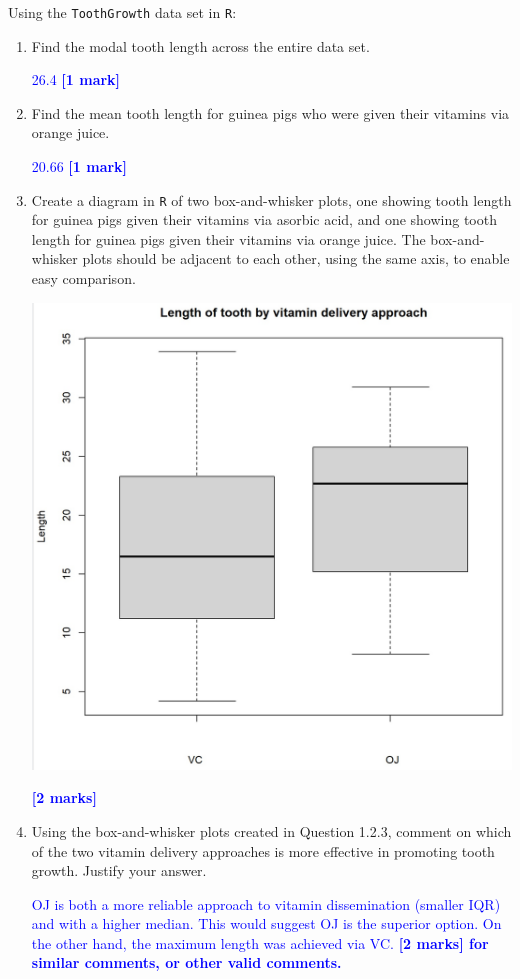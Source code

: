 \documentclass[11pt,a4paper]{article}
\begin{document}
\begin{question}
Using the \texttt{ToothGrowth} data set in \texttt{R}:
\begin{enumerate}
\item Find the modal tooth length across the entire data set.

\textcolor{blue}{26.4 \textbf{[1 mark]}}
\item Find the mean tooth length for guinea pigs who were given their vitamins via orange juice.



\textcolor{blue}{20.66 \textbf{[1 mark]}}

\item Create a diagram in \texttt{R} of two box-and-whisker plots, one showing tooth length for guinea pigs given their vitamins via asorbic acid, and one showing tooth length for guinea pigs given their vitamins via orange juice. The box-and-whisker plots should be adjacent to each other, using the same axis, to enable easy comparison.

\includegraphics[scale=6]{ISDSA1p1.jpg}

\textcolor{blue}{\textbf{[2 marks]}}

\item Using the box-and-whisker plots created in Question 1.2.3, comment on which of the two vitamin delivery approaches is more effective in promoting tooth growth. Justify your answer.

\textcolor{blue}{OJ is both a more reliable approach to vitamin dissemination (smaller IQR) and with a higher median. This would suggest OJ is the superior option. On the other hand, the maximum length was achieved via VC. \textbf{[2 marks] for similar comments, or other valid comments.}}

\end{enumerate}

\end{question}
\end{document}
